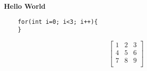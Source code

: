 \documentclass{article}
\begin{document}
\textbf{Hello World}
\begin{verbatim}
    for(int i=0; i<3; i++){
    }
\end{verbatim}

\[ \begin{bmatrix}
1 & 2  & 3 \\
4 & 5  & 6 \\
7 & 8  & 9 \\
\end{bmatrix} \] 
\end{document}
